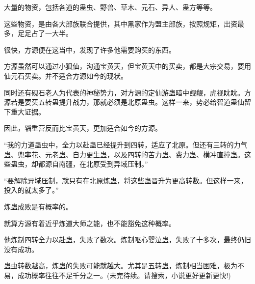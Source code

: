 \begin{this_body}
大量的物资，包括各道的蛊虫、野兽、草木、元石、异人、蛊方等等。

这些物资，是由各大部族联合提供，其中黑家作为盟主部族，按照规矩，出资最多，足足占了一大半。

很快，方源便在这当中，发现了许多他需要购买的东西。

方源虽然可以通过小狐仙，沟通宝黄天，但宝黄天中的买卖，都是大宗交易，要用仙元石买卖。并不适合方源如今的现状。

同时还有砚石老人为代表的神秘势力，对方源的定仙游蛊暗中觊觎，虎视眈眈。方源若是要买五转蛊提升战力，那就必须是北原蛊虫。这样一来，势必给智道蛊仙留下重大证据。

因此，辎重营反而比宝黄天，更加适合如今的方源。

“我的力道蛊虫中，全力以赴蛊已经提升到四转，适应了北原。但还有三转的力气蛊、兜率花、元老蛊、自力更生蛊，以及四转的苦力蛊、费力蛊、横冲直撞蛊。这些蛊虫，却都源自南疆，在北原受到异域压制。”

“要解除异域压制，就只有在北原炼蛊，将这些蛊晋升为更高转数。但这样一来，投入的就太多了。”

炼蛊成败是有概率的。

就算方源有着近乎炼道大师之能，也不能豁免这种概率。

他炼制四转全力以赴蛊，失败了数次。炼制呕心婴泣蛊，失败了十多次，最终仍旧没有成功。

蛊虫转数越高，炼蛊的失败可能就越大。尤其是五转蛊，炼制相当困难，极为不易，成功概率往往不足千分之一。(未完待续。请搜索，小说更好更新更快!)

\end{this_body}

